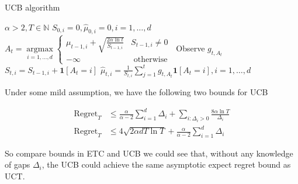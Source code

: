 \documentclass[a4paper, 11pt]{article} %
\begin{document}
\begin{multicols}{2}
		\begin{algorithm}[H]
			\caption{UCB algorithm}
			\begin{algorithmic}[1]
				\Require $\alpha > 2, T \in \mathbb{N}$
				\State $S_{0, i}=0, \hat{\mu}_{0, i}=0, i=1, \ldots, d$
					\State $A_{t}=\mathop{\arg \max}\limits_{i=1, \ldots, d} \begin{cases}\mu_{t-1, i}+\sqrt{\frac{2 \alpha \ln t}{S_{t-1, i}}} & S_{t-1, i} \neq 0 \\ -\infty & \text { otherwise }\end{cases}$
					\State Observe $g_{t, A_t}$
					\State $S_{t, i}=S_{t-1, i}+\mathbf{1}\left[A_{t}=i\right]$
					\State $\hat{\mu}_{t, i}=\frac{1}{S_{t, i}} \sum_{j=1}^{t} g_{t, A_{t}} \mathbf{1}\left[A_{t}=i\right], i=1, \ldots, d$
				\EndFor
			\end{algorithmic}
		\end{algorithm}
	
	Under some mild assumption, we have the following two bounds for UCB
	
	\begin{equation*}
		\begin{split}
			\operatorname{Regret}_{T} & \leq \frac{\alpha}{\alpha-2} \sum_{i=1}^{d} \Delta_{i}+\sum_{i: \Delta_{i}>0} \frac{8 \alpha \ln T}{\Delta_{i}} \\
			\operatorname{Regret}_{T} & \leq 4 \sqrt{2 \alpha d T \ln T}+\frac{\alpha}{\alpha-2} \sum_{i=1}^{d} \Delta_{i}
		\end{split}
	\end{equation*}

	So compare bounds in ETC and UCB we could see that, without any knowledge of gaps $\Delta_i$, the UCB could achieve the same asymptotic expect regret bound as UCT.
	\end{multicols}
	
	\newpage
	
\end{document}
